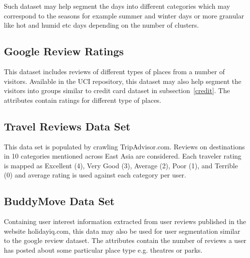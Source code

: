 \documentclass[12pt]{article}
\begin{document}
Such dataset may help segment the days into different categories which may correspond to the seasons for example summer and winter days or more granular like hot and humid etc days depending on the number of clusters.

\subsection{Google Review Ratings}
This dataset includes reviews of different types of places from a number of visitors. Available in the UCI repository, this dataset may also help segment the visitors into groups similar to credit card dataset in subsection~\ref{credit}. The attributes contain ratings for different type of places.

\subsection{Travel Reviews Data Set}
This data set is populated by crawling TripAdvisor.com. Reviews on destinations in 10 categories mentioned across East Asia are considered. Each traveler rating is mapped as Excellent (4), Very Good (3), Average (2), Poor (1), and Terrible (0) and average rating is used against each category per user.

\subsection{BuddyMove Data Set}
Containing user interest information extracted from user reviews published in the website holidayiq.com, this data may also be used for user segmentation similar to the google review dataset. The attributes contain the number of reviews a user has posted about some particular place type e.g.  theatres or parks.
\end{document}
